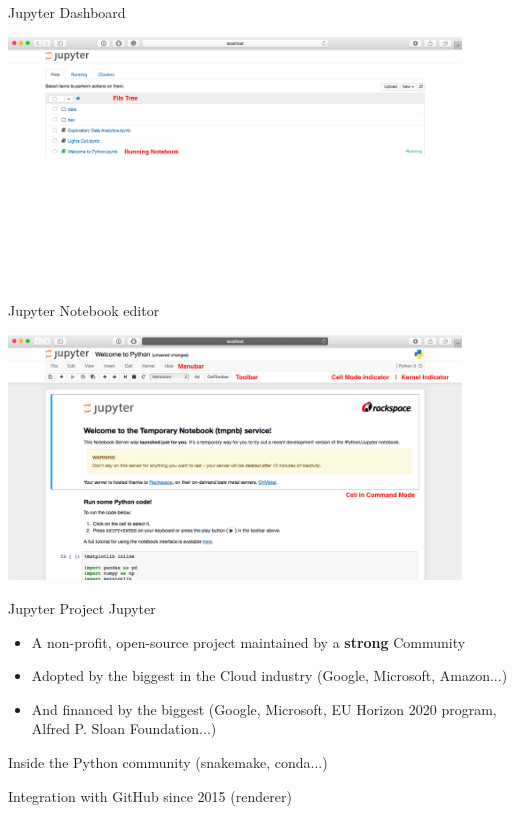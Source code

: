 \begin{frame}{Jupyter}
Dashboard

\begin{center}
    \includegraphics[width=12cm]{07_notebook/images/jupyter_dashboard.png}
\end{center}

\end{frame}

\begin{frame}{Jupyter}
Notebook editor

\begin{center}
    \includegraphics[width=12cm]{07_notebook/images/jupyter-notebook-editor.png}
\end{center}

\end{frame}

\begin{frame}{Jupyter}
Project Jupyter

\begin{itemize}
    \item A non-profit, open-source project maintained by a \textbf{strong} Community
    \item Adopted by the biggest in the Cloud industry (Google, Microsoft, Amazon...)
    \item And financed by the biggest (Google, Microsoft, EU Horizon 2020 program, Alfred P. Sloan Foundation...)
\end{itemize}

Inside the Python community (snakemake, conda...)\newline

Integration with GitHub since 2015 (renderer)

\end{frame}

